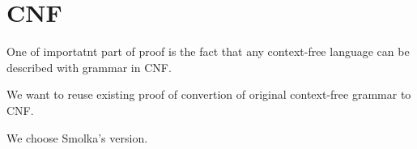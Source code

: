 \section{CNF}

One of importatnt part of proof is the fact that any context-free language can be described with grammar in CNF.

We want to reuse existing proof of convertion of original context-free grammar to CNF.

We choose Smolka's version.